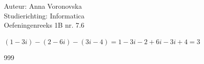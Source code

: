 \documentclass[a4paper]{article}
\begin{document}
  
\noindent \large Auteur: Anna Voronovska \\
\noindent \large Studierichting: Informatica\\
\noindent \large Oefeningenreeks 1B nr. 7.6\\

\medskip

\normalsize


$(1-3i)-(2-6i)-(3i-4)= 
1-3i-2+6i-3i+4=
3 $


\begin{thebibliography}{999}
\end{thebibliography}
\end{document}
